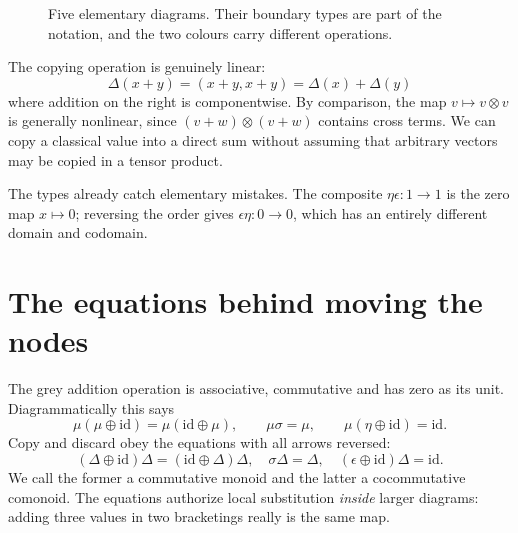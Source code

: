 \begin{figure}[H]
\centering
{}
\caption{Five elementary diagrams. Their boundary types are part of the notation, and the two colours carry different operations.}
\end{figure}

The copying operation is genuinely linear:
\[
 \Delta(x+y)=(x+y,x+y)=\Delta(x)+\Delta(y)
\]
where addition on the right is componentwise. By comparison, the map \(v\mapsto v\otimes v\) is generally nonlinear, since
\((v+w)\otimes(v+w)\) contains cross terms. We can copy a classical value into a direct sum without assuming that arbitrary vectors may be copied in a tensor product.

The types already catch elementary mistakes. The composite \(\eta\epsilon:1\to1\) is the zero map \(x\mapsto0\); reversing the order gives \(\epsilon\eta:0\to0\), which has an entirely different domain and codomain.

\section{The equations behind moving the nodes}

The grey addition operation is associative, commutative and has zero as its unit. Diagrammatically this says
\[
 \mu(\mu\oplus\mathrm{id})
 =\mu(\mathrm{id}\oplus\mu),\qquad
 \mu\sigma=\mu,\qquad
 \mu(\eta\oplus\mathrm{id})=\mathrm{id}.
\]
Copy and discard obey the equations with all arrows reversed:
\[
 (\Delta\oplus\mathrm{id})\Delta
 =(\mathrm{id}\oplus\Delta)\Delta,\quad
 \sigma\Delta=\Delta,\quad
 (\epsilon\oplus\mathrm{id})\Delta=\mathrm{id}.
\]
We call the former a commutative monoid and the latter a cocommutative comonoid. The equations authorize local substitution \emph{inside} larger diagrams: adding three values in two bracketings really is the same map.

